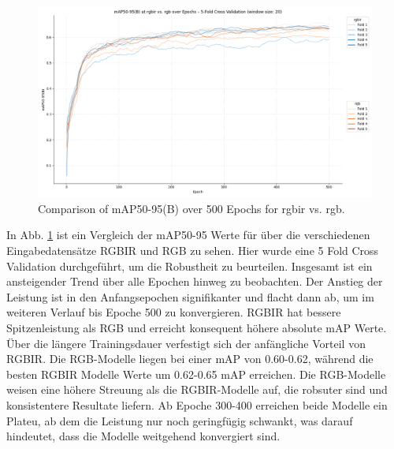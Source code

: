 \begin{figure}[h] 
    \centering %
    \includegraphics[width=1\textwidth]{images/rgbir/mAP@50-95/rgbir_vs_rgb_full.png} %
    \caption{Comparison of mAP50-95(B) over 500 Epochs for rgbir vs. rgb.} %
    \label{fig:map_rgbir_rgb} %
\end{figure}
In Abb. \ref{fig:map_rgbir_rgb} ist ein Vergleich der mAP50-95 Werte für über die verschiedenen Eingabedatensätze RGBIR und RGB zu sehen. Hier wurde eine 5 Fold Cross Validation durchgeführt, um die Robustheit zu beurteilen. Insgesamt ist ein ansteigender Trend über alle Epochen hinweg zu beobachten. Der Anstieg der Leistung ist in den Anfangsepochen signifikanter und flacht dann ab, um im weiteren Verlauf bis Epoche 500 zu konvergieren. RGBIR hat bessere Spitzenleistung als RGB und erreicht konsequent höhere absolute mAP Werte. Über die längere Trainingsdauer verfestigt sich der anfängliche Vorteil von RGBIR. Die RGB-Modelle liegen bei einer mAP von 0.60-0.62, während die besten RGBIR Modelle Werte um 0.62-0.65 mAP erreichen. Die RGB-Modelle weisen eine höhere Streuung als die RGBIR-Modelle auf, die robsuter sind und konsistentere Resultate liefern. Ab Epoche 300-400 erreichen beide Modelle ein Plateu, ab dem die Leistung nur noch geringfügig schwankt, was darauf hindeutet, dass die Modelle weitgehend konvergiert sind.

